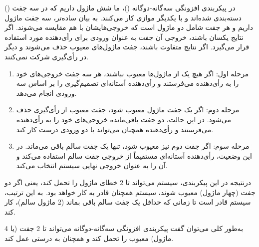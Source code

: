 \begin{qsolve}
	
	در پیکربندی افزونگی سه‌گانه-دوگانه ()، ما شش ماژول داریم که در سه جفت () دسته‌بندی شده‌اند و با یکدیگر موازی کار می‌کنند. به بیان ساده‌تر، سه جفت ماژول داریم و هر جفت شامل دو ماژول است که خروجی‌هایشان با هم مقایسه می‌شوند. اگر نتایج یکسان باشند، خروجی آن جفت به عنوان ورودی برای رأی‌دهنده مورد استفاده قرار می‌گیرد. اگر نتایج متفاوت باشند، جفت ماژول‌های معیوب حذف می‌شوند و دیگر در رأی‌گیری شرکت نمی‌کنند.
	
	
	
	\begin{enumerate}
		\item 
		مرحله اول: اگر هیچ یک از ماژول‌ها معیوب نباشند، هر سه جفت خروجی‌های خود را به رأی‌دهنده می‌فرستند و رأی‌دهنده آستانه‌ای تصمیم‌گیری را بر اساس سه ورودی انجام می‌دهد.
		
		\item 
		مرحله دوم: اگر یک جفت ماژول معیوب شود، جفت معیوب از رأی‌گیری حذف می‌شود. در این حالت، دو جفت باقی‌مانده خروجی‌های خود را به رأی‌دهنده می‌فرستند و رأی‌دهنده همچنان می‌تواند با دو ورودی درست کار کند.
		
		\item 
		مرحله سوم: اگر جفت دوم نیز معیوب شود، تنها یک جفت سالم باقی می‌ماند. در این وضعیت، رأی‌دهنده آستانه‌ای مستقیماً از خروجی جفت سالم استفاده می‌کند و آن را به عنوان خروجی نهایی سیستم انتخاب می‌کند.
	\end{enumerate}
	
	
	درنتیجه در این پیکربندی، سیستم می‌تواند تا 2 خطای ماژول را تحمل کند، یعنی اگر دو جفت (چهار ماژول) معیوب شوند، سیستم همچنان قادر به کار خواهد بود. به این ترتیب، سیستم قادر است تا زمانی که حداقل یک جفت  سالم باقی بماند (2 ماژول سالم)، کار کند.
	
	
	به‌طور کلی می‌توان گفت پیکربندی افزونگی سه‌گانه-دوگانه می‌تواند تا 2 جفت (یا 4 ماژول) معیوب را تحمل کند و همچنان به درستی عمل کند.
\end{qsolve}